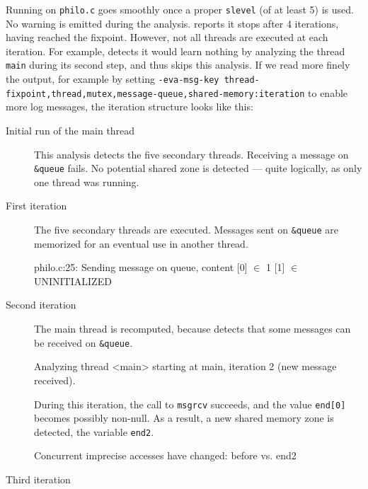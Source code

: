 \documentclass{frama-c-book}
\begin{document}
Running \mthread on \verb+philo.c+ goes smoothly once a proper
\verb+slevel+ (of at least 5) is used. No warning is emitted
during the analysis.
%
\mthread reports it
stops after 4 iterations, having reached the fixpoint.  However,
not all threads are executed at each iteration. For example,
\mthread detects it would learn nothing by analyzing the thread \verb+main+
during its second step,
and thus skips this analysis. If we read more finely
the output, for example by setting
\verb+-eva-msg-key thread-fixpoint,thread,mutex,message-queue,shared-memory:iteration+
to enable more log messages, the iteration structure looks like this:
\begin{description}
\item[Initial run of the main thread]
  This analysis detects the five secondary threads. Receiving
  a message on \verb+&queue+ fails. No potential shared zone
  is detected --- quite logically, as only one thread was running.

\item[First iteration]
  The five secondary threads are executed. Messages sent on
  \verb+&queue+ are memorized for an eventual use in another thread.
  \begin{logs}
 philo.c:25:
  Sending message on queue, content [0] $\in$ {1}
                                    [1] $\in$ UNINITIALIZED
  \end{logs}

\item[Second iteration]

The main thread is recomputed, because \mthread detects that some
messages can be received on \verb+&queue+.
\begin{logs}
  Analyzing thread <main> starting at main, iteration 2 (new message received).
\end{logs}
During this iteration, the call to \verb+msgrcv+ succeeds, and the
value \verb+end[0]+ becomes possibly non-null. As a result, a new
shared memory zone is detected, the variable \verb+end2+.
\begin{logs}
  Concurrent imprecise accesses have changed: before
    \nothing
  vs.
    end2
\end{logs}

\item[Third iteration]


\end{description}
\end{document}
